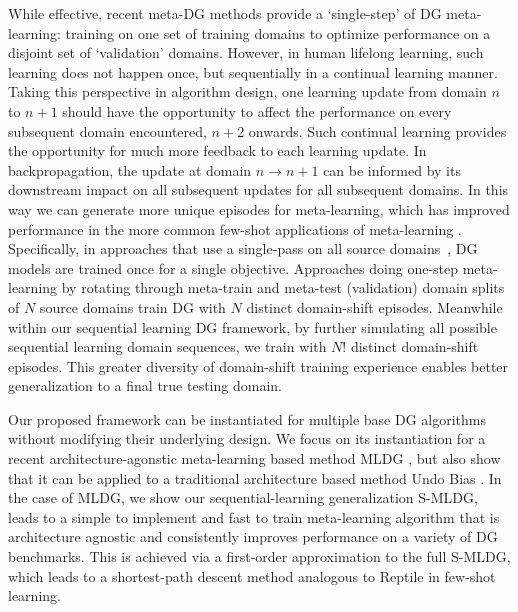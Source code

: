 \documentclass[runningheads]{llncs}
\newcommand{\nameS}{S-MLDG}
\begin{document}
While effective, recent meta-DG methods \cite{Li2018MLDG,NIPS2018_metareg} provide a `single-step' of DG meta-learning: training on one set of training domains to optimize performance on a  disjoint set of `validation' domains. However, in human lifelong learning, such learning does not happen once, but sequentially in a continual learning manner. Taking this perspective in algorithm design, one learning update from domain $n$ to $n+1$ should have the opportunity to affect the performance on every subsequent domain encountered, $n+2$ onwards. Such continual learning provides the opportunity for much more feedback to each learning update. In backpropagation, the update at domain $n\to n+1$ can be informed by its downstream impact on all subsequent updates for all subsequent domains. In this way we can generate more unique episodes for meta-learning, which has improved performance in the more common few-shot applications of meta-learning \cite{vinyals2016oneShot,pmlr-v80-wei18a,lopezpaz2017GEM}. Specifically, in approaches that use a single-pass on all source domains~\cite{ECCV12_Khosla,motiian2017CCSA,ganin2016dann}, DG models are trained once for a single objective. Approaches doing one-step meta-learning  \cite{Li2018MLDG,NIPS2018_metareg} by rotating through meta-train and meta-test (validation) domain splits of $N$ source domains train DG with $N$ distinct domain-shift episodes. Meanwhile within our sequential learning DG framework, by further simulating all possible sequential learning domain sequences, we train with $N!$ distinct domain-shift episodes. This greater diversity of domain-shift training experience enables better generalization to a final true testing domain. 

Our proposed framework can be instantiated for multiple base DG algorithms without modifying their underlying design. We focus on its instantiation for a recent architecture-agonstic meta-learning based method MLDG \cite{Li2018MLDG}, but also show that it can be applied to a  traditional architecture based method Undo Bias \cite{ECCV12_Khosla}. In the case of MLDG, we show  our sequential-learning generalization \nameS{}, leads to a simple to implement and fast to train meta-learning algorithm that is architecture agnostic and consistently improves performance on a variety of DG benchmarks. This is achieved via a first-order approximation to the full \nameS{}, which leads to a shortest-path descent method analogous to Reptile \cite{DBLP:journals/corr/abs-1803-02999} in few-shot learning.
\end{document}
